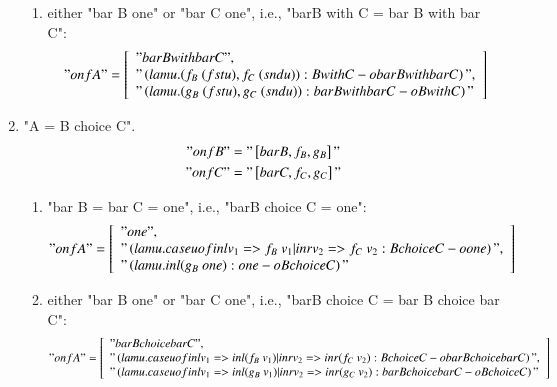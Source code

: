 \documentclass{article}
\begin{document}
\begin{enumerate}
\begin{enumerate}
  \item either "bar B \ne one" or "bar C \ne one", i.e., "bar{B with C} = bar B with bar C":
    \begin{gather*}
      "onf A" =
      \left[ \begin{array}{l}
           "bar B with bar C", \\
           "\left( lam u. ( f_B\ ( fst u ), f_C\ ( snd u ) ) : B with C -o bar B with bar C \right)",\\
           "\left( lam u. ( g_B\ ( fst u ), g_C\ ( snd u ) ) : bar B with bar C -o B with C \right)"
         \end{array} \right]
    \end{gather*}
  \end{enumerate}

\item "A = B choice C".
  \begin{align*}
    "onf B" &= "\left[ bar B, f_B, g_B \right]" \\
    "onf C" &= "\left[ bar C, f_C, g_C \right]"
  \end{align*}

  \begin{enumerate}
  \item "bar B = bar C = one", i.e., "bar{B choice C} = one":
    \begin{gather*}
      "onf A" =
      \left[ \begin{array}{l}
           "one", \\
           "\left( lam u. case u of inl v_1 => f_B\ v_1 | inr v_2 => f_C\ v_2 : B choice C -o one \right)",\\
           "\left( lam u. inl ( g_B\ one ) : one -o B choice C \right)"
         \end{array} \right]
    \end{gather*}

  \item either "bar B \ne one" or "bar C \ne one", i.e., "bar{B choice C} = bar B choice bar C":
    \begin{gather*}
      "onf A" =
      \left[ \begin{array}{l}
           "bar B choice bar C", \\
           "\left( lam u. case u of inl v_1 => inl ( f_B\ v_1 ) | inr v_2 => inr ( f_C\ v_2 )
                   : B choice C -o bar B choice bar C \right)",\\
           "\left( lam u. case u of inl v_1 => inl ( g_B\ v_1 ) | inr v_2 => inr ( g_C\ v_2 )
                   : bar B choice bar C -o B choice C \right)"
         \end{array} \right]
    \end{gather*}
  \end{enumerate}


\end{enumerate}
\end{document}
